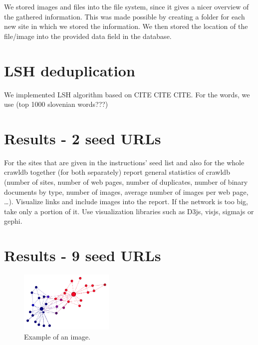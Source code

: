 \documentclass[9pt]{IEEEtran}
\begin{document}
We stored images and files into the file system, since it gives a nicer overview of the gathered information. This was made possible by creating a folder for each new site in which we stored the information. We then stored the location of the file/image into the provided data field in the database.




\section{LSH deduplication}
We implemented LSH algorithm based on CITE CITE CITE. For the words, we use (top 1000 slovenian words???)




\section{Results - 2 seed URLs}

For the sites that are given in the instructions’ seed list and also for the whole crawldb together (for both separately) report general statistics of crawldb (number of sites, number of web pages, number of duplicates, number of binary documents by type, number of images, average number of images per web page, …). Visualize links and include images into the report. If the network is too big, take only a portion of it. Use visualization libraries such as D3js, visjs, sigmajs or gephi.

\section{Results - 9 seed URLs}




\begin{figure}[h] \centering
	\includegraphics[width=0.4\textwidth]{karate.png}
	\caption{{Example of an image.}}
	\label{fig:karate}
\end{figure}
\end{document}
